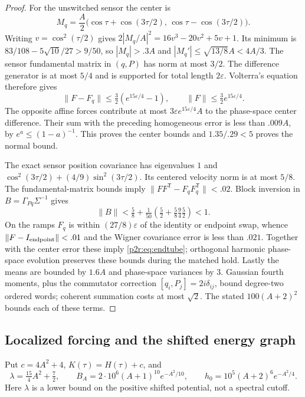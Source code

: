 \documentclass[11pt]{article}
\numberwithin{equation}{section}
\theoremstyle{definition}
\theoremstyle{remark}
\begin{document}
\begin{proof}
For the unswitched sensor the center is
\[
 M_q=\frac A2
   \big(\cos\tau+\cos(3\tau/2),\,
        \cos\tau-\cos(3\tau/2)\big).
\]
Writing $v=\cos^2(\tau/2)$ gives
$2|M_q/A|^2=16v^3-20v^2+5v+1$.
Its minimum is $83/108-5\sqrt{10}/27>9/50$, so
$|M_q|>.3A$ and $|M_q'|\leq\sqrt{13/8}A<4A/3$.
The sensor fundamental matrix in $(q,P)$ has norm at most $3/2$.
The difference generator is at most $5/4$ and is supported for total
length $2\varepsilon$. Volterra's equation therefore gives
\[
 \|F-F_q\|\leq\tfrac32(e^{15\varepsilon/4}-1),\qquad
 \|F\|\leq\tfrac32e^{15\varepsilon/4}.
\]
The opposite affine forces contribute at most
$3\varepsilon e^{15\varepsilon/4}A$ to the phase-space center
difference. Their sum with the preceding homogeneous error is
less than $.009A$, by $e^a\leq(1-a)^{-1}$.
This proves the center bounds and $1.35/.29<5$ proves the normal bound.

The exact sensor position covariance has eigenvalues
$1$ and $\cos^2(3\tau/2)+(4/9)\sin^2(3\tau/2)$.
Its centered velocity norm is at most $5/8$.
The fundamental-matrix bounds imply
$\|FF^\mathsf T-F_qF_q^\mathsf T\|<.02$.
Block inversion in $B=\Gamma_{Pq}\Sigma^{-1}$ gives
\[
 \|B\|<
 \tfrac58+\tfrac1{50}
       \left(\tfrac52+\tfrac58\tfrac94\tfrac52\right)<1.
\]
On the ramps $F_q$ is within $(27/8)\varepsilon$ of the identity
or endpoint swap, whence $\|F-I_{\rm endpoint}\|<.01$ and the
Wigner covariance error is less than $.021$.
Together with the center error these imply
\eqref{p2r:eq:endtube}; orthogonal harmonic phase-space evolution
preserves these bounds during the matched hold.
Lastly the means are bounded by $1.6A$ and phase-space variances
by $3$. Gaussian fourth moments, plus the commutator correction
$[q_i,P_j]=2i\delta_{ij}$, bound degree-two ordered words;
coherent summation costs at most $\sqrt2$. The stated
$100(A+2)^2$ bounds each of these terms.
\end{proof}

\subsection{Localized forcing and the shifted energy graph}

Put $c=4A^2+4$, $K(\tau)=H(\tau)+c$, and
\begin{equation}\label{p2r:eq:constants}
 \lambda=\tfrac{15}4A^2+\tfrac72,\qquad
 B_A=2\cdot10^6(A+1)^{10}e^{-A^2/10},\qquad
 h_0=10^5(A+2)^6e^{-A^2/4}.
\end{equation}
Here $\lambda$ is a lower bound on the positive shifted potential,
not a spectral cutoff.
\end{document}
